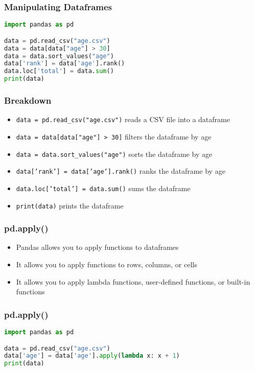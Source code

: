 \documentclass[serif, 9pt, aspectratio=32]{beamer}
\begin{document}
\begin{frame}[fragile]
    \frametitle{Manipulating Dataframes}
    \begin{lstlisting}[language=Python]
import pandas as pd

data = pd.read_csv("age.csv")
data = data[data["age"] > 30]
data = data.sort_values("age")
data['rank'] = data['age'].rank()
data.loc['total'] = data.sum()
print(data)
    \end{lstlisting}
\end{frame}

\begin{frame}
    \centering
    \frametitle{Breakdown}
    \begin{itemize}
        \setlength{\itemsep}{2em}
        \item \texttt{data = pd.read\_csv("age.csv")} reads a CSV file into a dataframe
        \item \texttt{data = data[data["age"] > 30]} filters the dataframe by age
        \item \texttt{data = data.sort\_values("age")} sorts the dataframe by age
        \item \texttt{data['rank'] = data['age'].rank()} ranks the dataframe by age
        \item \texttt{data.loc['total'] = data.sum()} sums the dataframe
        \item \texttt{print(data)} prints the dataframe
    \end{itemize}
\end{frame}

\begin{frame}
    \centering
    \frametitle{pd.apply()}
    \begin{itemize}
        \setlength{\itemsep}{2em}
        \item Pandas allows you to apply functions to dataframes
        \item It allows you to apply functions to rows, columns, or cells
        \item It allows you to apply lambda functions, user-defined functions, or built-in functions
    \end{itemize}
\end{frame}

\begin{frame}[fragile]
    \frametitle{pd.apply()}
    \begin{lstlisting}[language=Python]
import pandas as pd

data = pd.read_csv("age.csv")
data['age'] = data['age'].apply(lambda x: x + 1)
print(data)
    \end{lstlisting}
\end{frame}
\end{document}
